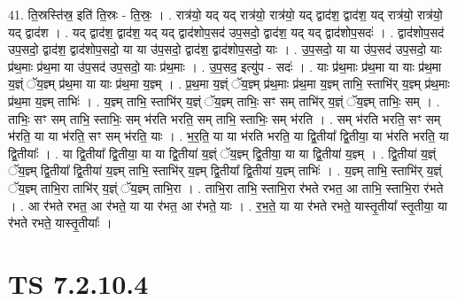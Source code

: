 \documentclass[17pt]{extarticle}
\begin{document}
41. ति॒स्रस्ति॑स्र॒ इति॑ ति॒स्रः - ति॒स्रः॒ । . रात्र॑यो॒ यद् यद् रात्र॑यो॒ रात्र॑यो॒ यद् द्वाद॑श॒ द्वाद॑श॒ यद् रात्र॑यो॒ रात्र॑यो॒ यद् द्वाद॑श । . यद् द्वाद॑श॒ द्वाद॑श॒ यद् यद् द्वाद॑शोप॒सद॑ उप॒सदो॒ द्वाद॑श॒ यद् यद् द्वाद॑शोप॒सदः॑ । . द्वाद॑शोप॒सद॑ उप॒सदो॒ द्वाद॑श॒ द्वाद॑शोप॒सदो॒ या या उ॑प॒सदो॒ द्वाद॑श॒ द्वाद॑शोप॒सदो॒ याः । . उ॒प॒सदो॒ या या उ॑प॒सद॑ उप॒सदो॒ याः प्र॑थ॒माः प्र॑थ॒मा या उ॑प॒सद॑ उप॒सदो॒ याः प्र॑थ॒माः । . उ॒प॒सद॒ इत्यु॑प - सदः॑ । . याः प्र॑थ॒माः प्र॑थ॒मा या याः प्र॑थ॒मा य॒ज्ञ्ं ॅय॒ज्ञ्म् प्र॑थ॒मा या याः प्र॑थ॒मा य॒ज्ञ्म् । . प्र॒थ॒मा य॒ज्ञ्ं ॅय॒ज्ञ्म् प्र॑थ॒माः प्र॑थ॒मा य॒ज्ञ्म् ताभि॒ स्ताभि॑र् य॒ज्ञ्म् प्र॑थ॒माः प्र॑थ॒मा य॒ज्ञ्म् ताभिः॑ । . य॒ज्ञ्म् ताभि॒ स्ताभि॑र् य॒ज्ञ्ं ॅय॒ज्ञ्म् ताभिः॒ सꣳ सम् ताभि॑र् य॒ज्ञ्ं ॅय॒ज्ञ्म् ताभिः॒ सम् । . ताभिः॒ सꣳ सम् ताभि॒ स्ताभिः॒ सम् भ॑रति भरति॒ सम् ताभि॒ स्ताभिः॒ सम् भ॑रति । . सम् भ॑रति भरति॒ सꣳ सम् भ॑रति॒ या या भ॑रति॒ सꣳ सम् भ॑रति॒ याः । . भ॒र॒ति॒ या या भ॑रति भरति॒ या द्वि॒तीया᳚ द्वि॒तीया॒ या भ॑रति भरति॒ या द्वि॒तीयाः᳚ । . या द्वि॒तीया᳚ द्वि॒तीया॒ या या द्वि॒तीया॑ य॒ज्ञ्ं ॅय॒ज्ञ्म् द्वि॒तीया॒ या या द्वि॒तीया॑ य॒ज्ञ्म् । . द्वि॒तीया॑ य॒ज्ञ्ं ॅय॒ज्ञ्म् द्वि॒तीया᳚ द्वि॒तीया॑ य॒ज्ञ्म् ताभि॒ स्ताभि॑र् य॒ज्ञ्म् द्वि॒तीया᳚ द्वि॒तीया॑ य॒ज्ञ्म् ताभिः॑ । . य॒ज्ञ्म् ताभि॒ स्ताभि॑र् य॒ज्ञ्ं ॅय॒ज्ञ्म् ताभि॒रा ताभि॑र् य॒ज्ञ्ं ॅय॒ज्ञ्म् ताभि॒रा । . ताभि॒रा ताभि॒ स्ताभि॒रा र॑भते रभत॒ आ ताभि॒ स्ताभि॒रा र॑भते । . आ र॑भते रभत॒ आ र॑भते॒ या या र॑भत॒ आ र॑भते॒ याः । . र॒भ॒ते॒ या या र॑भते रभते॒ यास्तृ॒तीया᳚ स्तृ॒तीया॒ या र॑भते रभते॒ यास्तृ॒तीयाः᳚ । \newline
\pagebreak
{}

\section{ TS 7.2.10.4 }
\end{document}
